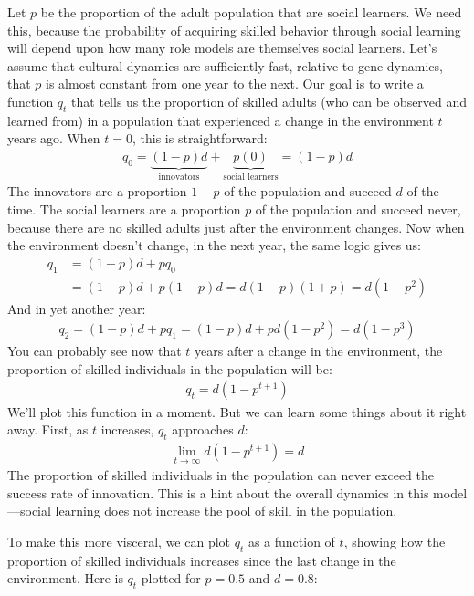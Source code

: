 \documentclass[10pt,reqno]{amsbook}
\numberwithin{equation}{chapter}
\begin{document}
Let $p$ be the proportion of the adult population that are social learners. We need this, because the probability of acquiring skilled behavior through social learning will depend upon how many role models are themselves social learners. Let's assume that cultural dynamics are sufficiently fast, relative to gene dynamics, that $p$ is almost constant from one year to the next. Our goal is to write a function $q_t$ that tells us the proportion of skilled adults (who can be observed and learned from) in a population that experienced a change in the environment $t$ years ago. When $t=0$, this is straightforward:
\begin{align*}
	q_0 = \underbrace{(1-p) d}_\text{innovators} + \underbrace{p (0)}_\text{social learners} = (1-p)d
\end{align*}
The innovators are a proportion $1-p$ of the population and succeed $d$ of the time. The social learners are a proportion $p$ of the population and succeed never, because there are no skilled adults just after the environment changes. Now 
when the environment doesn't change, in the next year, the same logic gives us:
\begin{align*}
	q_1 &= (1-p) d + p q_0 \\
	& = (1-p) d + p (1-p) d = d(1-p)(1+p) = d(1-p^2)
\end{align*}
And in yet another year:
\begin{align*}
	q_2 = (1-p) d + p q_1 = (1-p) d + p d (1-p^2) = d (1-p^3)
\end{align*}
You can probably see now that $t$ years after a change in the environment, the proportion of skilled individuals in the population will be:
\begin{align*}
	q_t = d (1-p^{t+1})
\end{align*}
We'll plot this function in a moment. But we can learn some things about it right away. First, as $t$ increases, $q_t$ approaches $d$: 
\begin{align*}
	\lim_{t \rightarrow \infty} d (1-p^{t+1}) = d
\end{align*}
The proportion of skilled individuals in the population can never exceed the success rate of innovation. This is a hint about the overall dynamics in this model---social learning does not increase the pool of skill in the population.

To make this more visceral, we can plot $q_t$ as a function of $t$, showing how the proportion of skilled individuals increases since the last change in the environment. Here is $q_t$ plotted for $p=0.5$ and $d=0.8$:
\end{document}
